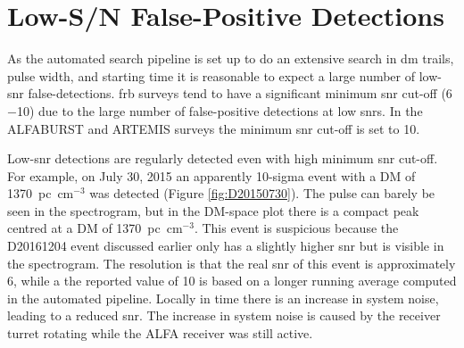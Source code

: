 \documentclass[a4paper,fleqn,usenatbib]{mnras}
\begin{document}
\section{Low-S/N False-Positive Detections}
\label{sec:low_snr}

As the automated search pipeline is set up to do an extensive search in \gls{dm}
trails, pulse width, and starting time it is reasonable to expect a large number
of low-\gls{snr} false-detections.  \gls{frb} surveys tend to have a significant
minimum \gls{snr} cut-off (6$-$10) due to the large number of false-positive
detections at low \glspl{snr}.  In the ALFABURST and ARTEMIS
\citep{2015MNRAS.452.1254K} surveys the minimum \gls{snr} cut-off is set to 10.

Low-\gls{snr} detections are regularly detected even with high minimum \gls{snr} cut-off.
For example, on July 30, 2015 an apparently 10-sigma event with a DM of
1370~pc~cm$^{-3}$ was detected (Figure \ref{fig:D20150730}). The pulse can
barely be seen in the spectrogram, but in the DM-space plot there is a compact
peak centred at a DM of 1370~pc~cm$^{-3}$. This event is suspicious because the
D20161204 event discussed earlier only has a slightly higher \gls{snr} but is
visible in the spectrogram. The resolution is that the real \gls{snr} of this
event is approximately 6, while a the reported value of 10 is based on a longer
running average computed in the automated pipeline. Locally in time there is an
increase in system noise, leading to a reduced \gls{snr}. The increase in system noise
is caused by the receiver turret rotating while the ALFA receiver was still
active.
\end{document}
